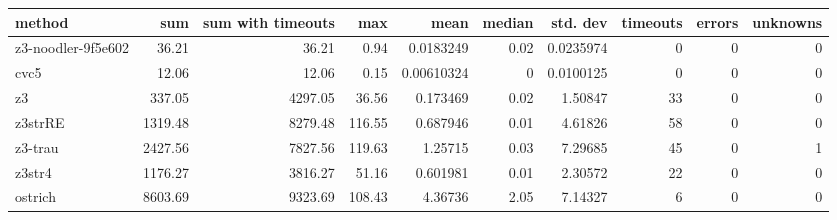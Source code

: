\begin{tabular}{lrrrrrrrrr}
\hline
 method             &     sum &   sum with timeouts &    max &       mean &   median &   std. dev &   timeouts &   errors &   unknowns \\
\hline
 z3-noodler-9f5e602 &   36.21 &               36.21 &   0.94 & 0.0183249  &     0.02 &  0.0235974 &          0 &        0 &          0 \\
 cvc5               &   12.06 &               12.06 &   0.15 & 0.00610324 &     0    &  0.0100125 &          0 &        0 &          0 \\
 z3                 &  337.05 &             4297.05 &  36.56 & 0.173469   &     0.02 &  1.50847   &         33 &        0 &          0 \\
 z3strRE            & 1319.48 &             8279.48 & 116.55 & 0.687946   &     0.01 &  4.61826   &         58 &        0 &          0 \\
 z3-trau            & 2427.56 &             7827.56 & 119.63 & 1.25715    &     0.03 &  7.29685   &         45 &        0 &          1 \\
 z3str4             & 1176.27 &             3816.27 &  51.16 & 0.601981   &     0.01 &  2.30572   &         22 &        0 &          0 \\
 ostrich            & 8603.69 &             9323.69 & 108.43 & 4.36736    &     2.05 &  7.14327   &          6 &        0 &          0 \\
\hline
\end{tabular}
